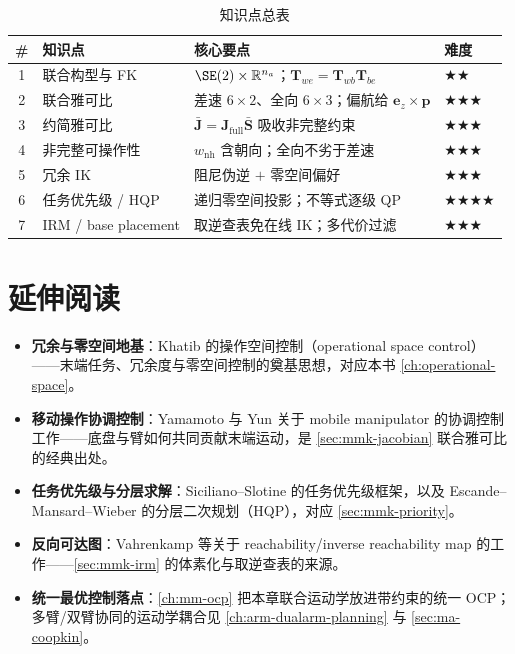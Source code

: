 \begin{table}[H]\centering\small
\caption{知识点总表}
\begin{tabular}{clll}
\toprule
\# & 知识点 & 核心要点 & 难度 \\
\midrule
1 & 联合构型与 FK & $\SE(2)\times\mathbb{R}^{n_a}$；$\mathbf{T}_{we}=\mathbf{T}_{wb}\mathbf{T}_{be}$ & \(\bigstar\bigstar\) \\
2 & 联合雅可比 & 差速 $6\times2$、全向 $6\times3$；偏航给 $\mathbf{e}_z\times\mathbf{p}$ & \(\bigstar\bigstar\bigstar\) \\
3 & 约简雅可比 & $\bar{\mathbf{J}}=\mathbf{J}_{\text{full}}\bar{\mathbf{S}}$ 吸收非完整约束 & \(\bigstar\bigstar\bigstar\) \\
4 & 非完整可操作性 & $w_{\text{nh}}$ 含朝向；全向不劣于差速 & \(\bigstar\bigstar\bigstar\) \\
5 & 冗余 IK & 阻尼伪逆 $+$ 零空间偏好 & \(\bigstar\bigstar\bigstar\) \\
6 & 任务优先级 / HQP & 递归零空间投影；不等式逐级 QP & \(\bigstar\bigstar\bigstar\bigstar\) \\
7 & IRM / base placement & 取逆查表免在线 IK；多代价过滤 & \(\bigstar\bigstar\bigstar\) \\
\bottomrule
\end{tabular}
\end{table}

\section*{延伸阅读}
\begin{itemize}
  \item \textbf{冗余与零空间地基}：Khatib 的操作空间控制（operational space control）——末端任务、冗余度与零空间控制的奠基思想，对应本书 \cref{ch:operational-space}。
  \item \textbf{移动操作协调控制}：Yamamoto 与 Yun 关于 mobile manipulator 的协调控制工作——底盘与臂如何共同贡献末端运动，是 \cref{sec:mmk-jacobian} 联合雅可比的经典出处。
  \item \textbf{任务优先级与分层求解}：Siciliano--Slotine 的任务优先级框架，以及 Escande--Mansard--Wieber 的分层二次规划（HQP），对应 \cref{sec:mmk-priority}。
  \item \textbf{反向可达图}：Vahrenkamp 等关于 reachability/inverse reachability map 的工作——\cref{sec:mmk-irm} 的体素化与取逆查表的来源。
  \item \textbf{统一最优控制落点}：\cref{ch:mm-ocp} 把本章联合运动学放进带约束的统一 OCP；多臂/双臂协同的运动学耦合见 \cref{ch:arm-dualarm-planning} 与 \cref{sec:ma-coopkin}。
\end{itemize}

